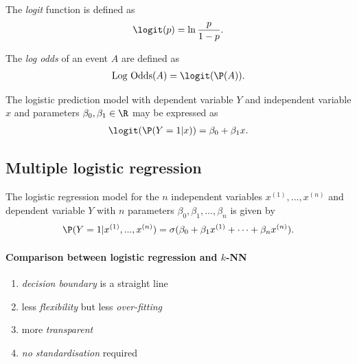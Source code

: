 \documentclass{article}
\begin{document}
\begin{definition}
	The \emph{logit} function is defined as
	\begin{align*}
		\logit(p) = \ln\frac{p}{1-p}.
	\end{align*}
\end{definition}

\begin{definition}
	The \emph{log odds} of an event $A$ are defined as
	\begin{align*}
		\text{Log Odds}(A)=\logit(\P(A)).
	\end{align*}
\end{definition}

\begin{corollary}
	The logistic prediction model with dependent variable $Y$ and
	independent variable $x$ and parameters $\beta_0,\beta_1\in\R$
	may be expressed as 
	\begin{align*}
		\logit(\P(Y=1|x)) = \beta_0 + \beta_1 x.
	\end{align*}
\end{corollary}

\subsection{Multiple logistic regression}

\begin{definition}
	The logistic regression model for the $n$ independent variables $x^{(1)},
	..., x^{(n)}$ and dependent variable $Y$ with $n$ parameters
	$\beta_0,\beta_1, ..., \beta_n$ is given by
	\begin{align*}
		\P(Y=1|x^{(1)},...,x^{(n)})=\sigma(\beta_0+\beta_1 x^{(1)}+\cdots + \beta_n x^{(n)}).
	\end{align*}
\end{definition}

\paragraph{Comparison between logistic regression and $k$-NN}
\begin{enumerate}
	\item \emph{decision boundary} is a straight line
	\item less \emph{flexibility} but less \emph{over-fitting}
	\item more \emph{transparent}
	\item \emph{no standardisation} required
\end{enumerate}
\end{document}
